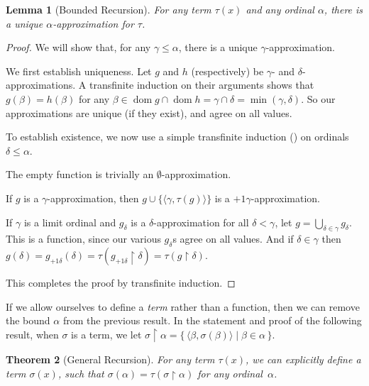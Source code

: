 \documentclass[10pt,a4paper]{article}
\makeatletter
\theoremstyle{plain}
\newtheorem{thm}{Theorem}[section]
\newtheorem{lem}[thm]{Lemma}
\theoremstyle{definition}
\theoremstyle{remark}
\newcommand*{\ollabel}[1]{\label{#1}}
\newcommand{\olref}{\@ifnextchar[{\olref@i}{\olref@final}}
\def\olref@i[#1]{\@ifnextchar[{\olref@ii}{\olref@final}}
\def\olref@ii[#1]{\@ifnextchar[{\olref@iii}{\olref@final}}
\def\olref@iii[#1]{\olref@final}
\def\olref@final#1{\ref{#1}}
\providecommand{\tuple}[1]{\langle #1 \rangle}
\providecommand{\ordsucc}{\mathord{+1}}
\providecommand{\dom}{\operatorname{dom}}
\providecommand{\Setabs}[2]{\{\, #1 \mid #2 \,\}}
\providecommand{\funrestrictionto}[2]{#1 \upharpoonright #2}
\makeatother
\begin{document}
\begin{lem}[Bounded Recursion]\ollabel{transrecursionfun}
For any term $\tau(x)$ and any ordinal $\alpha$, there is a unique $\alpha$-approximation for $\tau$.
\end{lem}
\begin{proof}
We will show that, for any $\gamma \leq \alpha$, there is a unique
$\gamma$-approximation. 

We first establish uniqueness. Let $g$ and $h$ (respectively) be $\gamma$- and $\delta$-approximations. A transfinite induction on their arguments shows that
$g(\beta) = h(\beta)$ for any $\beta \in \dom{g} \cap \dom{h} =
\gamma \cap \delta = \min(\gamma, \delta)$. So our approximations are unique (if they exist), and agree on all values.

To establish existence, we now use a simple transfinite induction
(\olref[ordinals][opps]{simpletransrecursion}) on ordinals
$\delta \leq \alpha$. 

The empty function is trivially an $\emptyset$-approximation. 

If $g$ is a $\gamma$-approximation, then $g \cup
\{\tuple{\gamma, \tau(g)}\}$ is a $\ordsucc{\gamma}$-approximation.

If $\gamma$ is a limit ordinal and $g_\delta$ is a $\delta$-approximation for all $\delta < \gamma$, let $g = \bigcup_{\delta \in \gamma} g_\delta$. This
is a function, since our various $g_\delta$s agree on all values. And
if $\delta \in \gamma$ then $g(\delta) = g_{\ordsucc{\delta}}(\delta) =
\tau(\funrestrictionto{g_{\ordsucc{\delta}}}{\delta}) =
\tau(\funrestrictionto{g}{\delta})$.

This completes the proof by transfinite induction.
\end{proof}

If we allow ourselves to define a \emph{term} rather than a function,
then we can remove the bound $\alpha$ from the previous result. In
the statement and proof of the following result, when $\sigma$ is a term, we
let $\funrestrictionto{\sigma}{\alpha} = \Setabs{\tuple{\beta,
\sigma(\beta)}}{\beta \in \alpha}$.

\begin{thm}[General Recursion]\ollabel{transrecursionschema}
For any term $\tau(x)$, we can explicitly define a term
$\sigma(x)$, such that
$\sigma(\alpha) = \tau(\funrestrictionto{\sigma}{\alpha})$ for any
ordinal~$\alpha$.
\end{thm}
\end{document}
